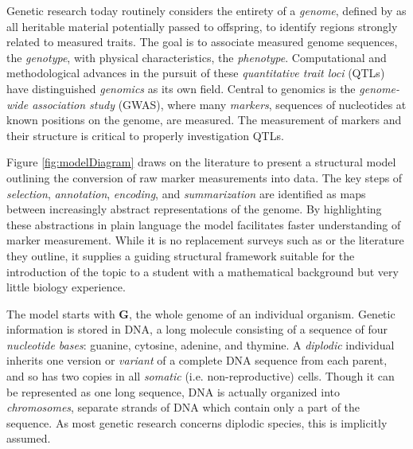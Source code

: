 \documentclass[12pt]{article}
\newcommand{\m}[1]{\mathbf{#1}}               %
\begin{document}
Genetic research today routinely considers the entirety of a \emph{genome}, defined by \cite{doergeetal1997search} as all heritable material potentially passed to offspring, to identify regions strongly related to measured traits. The goal is to associate measured genome sequences, the \emph{genotype}, with physical characteristics, the \emph{phenotype}. Computational and methodological advances in the pursuit of these \emph{quantitative trait loci} (QTLs) have distinguished \emph{genomics} as its own field. Central to genomics is the \emph{genome-wide association study} (GWAS), where many \emph{markers}, sequences of nucleotides at known positions on the genome, are measured. The measurement of markers and their structure is critical to properly investigation QTLs.

Figure \ref{fig:modelDiagram} draws on the literature to present a structural model outlining the conversion of raw marker measurements into data. The key steps of \emph{selection}, \emph{annotation}, \emph{encoding}, and \emph{summarization} are identified as maps between increasingly abstract representations of the genome. By highlighting these abstractions in plain language the model facilitates faster understanding of marker measurement. While it is no replacement surveys such as \cite{uffelmannetal2021gwas, tametal2019benefits} or the literature they outline, it supplies a guiding structural framework suitable for the introduction of the topic to a student with a mathematical background but very little biology experience.

The model starts with $\m{G}$, the whole genome of an individual organism. Genetic information is stored in DNA, a long molecule consisting of a sequence of four \emph{nucleotide bases}: guanine, cytosine, adenine, and thymine. A \emph{diplodic} individual inherits one version or \emph{variant} of a complete DNA sequence from each parent, and so has two copies in all \emph{somatic} (i.e. non-reproductive) cells. Though it can be represented as one long sequence, DNA is actually organized into \emph{chromosomes}, separate strands of DNA which contain only a part of the sequence. As most genetic research concerns diplodic species, this is implicitly assumed.
\end{document}
